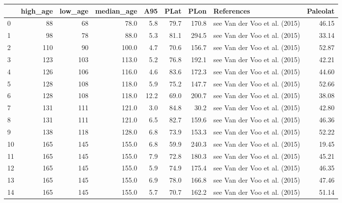 \documentclass[11pt]{article}
\begin{document}
    \begin{sidewaystable}
    {\tiny\begin{tabular}{lrrrrrrlr}
\toprule
{} &  high\_age &  low\_age &  median\_age &   A95 &  PLat &   PLon &                        References &  Paleolat \\
\midrule
0  &        88 &       68 &        78.0 &   5.8 &  79.7 &  170.8 &     see Van der Voo et al. (2015) &     46.15 \\
1  &        98 &       78 &        88.0 &   5.3 &  81.1 &  294.5 &     see Van der Voo et al. (2015) &     33.14 \\
2  &       110 &       90 &       100.0 &   4.7 &  70.6 &  156.7 &     see Van der Voo et al. (2015) &     52.87 \\
3  &       123 &      103 &       113.0 &   5.2 &  76.8 &  192.1 &     see Van der Voo et al. (2015) &     42.21 \\
4  &       126 &      106 &       116.0 &   4.6 &  83.6 &  172.3 &     see Van der Voo et al. (2015) &     44.60 \\
5  &       128 &      108 &       118.0 &   5.9 &  75.2 &  147.7 &     see Van der Voo et al. (2015) &     52.66 \\
6  &       128 &      108 &       118.0 &  12.2 &  69.0 &  200.7 &     see Van der Voo et al. (2015) &     38.08 \\
7  &       131 &      111 &       121.0 &   3.0 &  84.8 &   30.2 &     see Van der Voo et al. (2015) &     42.80 \\
8  &       131 &      111 &       121.0 &   6.5 &  82.7 &  159.6 &     see Van der Voo et al. (2015) &     46.36 \\
9  &       138 &      118 &       128.0 &   6.8 &  73.9 &  153.3 &     see Van der Voo et al. (2015) &     52.22 \\
10 &       165 &      145 &       155.0 &   6.8 &  59.9 &  240.3 &     see Van der Voo et al. (2015) &     19.45 \\
11 &       165 &      145 &       155.0 &   7.9 &  72.8 &  180.3 &     see Van der Voo et al. (2015) &     45.21 \\
12 &       165 &      145 &       155.0 &   5.9 &  74.9 &  175.4 &     see Van der Voo et al. (2015) &     46.35 \\
13 &       165 &      145 &       155.0 &   6.9 &  78.0 &  166.8 &     see Van der Voo et al. (2015) &     47.46 \\
14 &       165 &      145 &       155.0 &   5.7 &  70.7 &  162.2 &     see Van der Voo et al. (2015) &     51.14 \\

\end{tabular}}
\end{sidewaystable}
\end{document}
